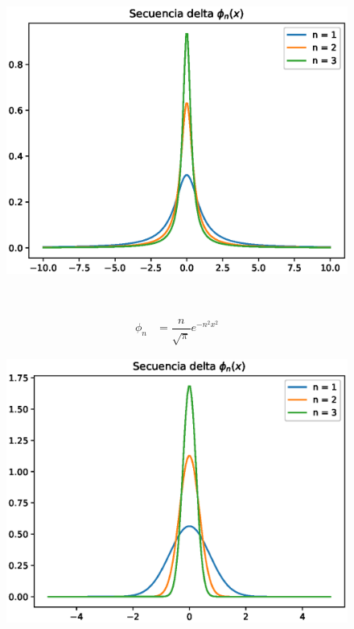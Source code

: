 \begin{minipage}{9cm}
\begin{figure}[H]
\includegraphics[scale=0.6]{Imagenes/secuencia_delta_01.eps}
\end{figure}
\end{minipage}
\\
\begin{minipage}{4cm}
\begin{align*}
\phi_{n} &= \dfrac{n}{\sqrt{\pi}} e^{-n^{2} x^{2}}
\end{align*}
\end{minipage}
\hspace{1cm}
\begin{minipage}{9cm}
\begin{figure}[H]
\includegraphics[scale=0.6]{Imagenes/secuencia_delta_02.eps}
\end{figure}
\end{minipage}
